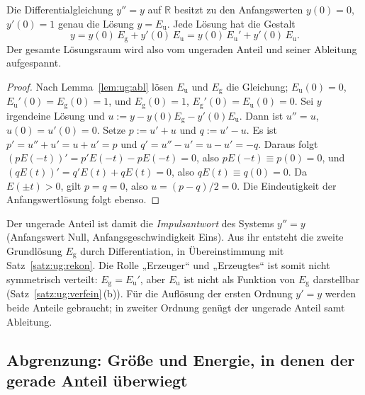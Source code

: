 \begin{satz}[Fundamentallösung]\label{satz:ug:fund}
Die Differentialgleichung $y''=y$ auf $\mathbb{R}$ besitzt zu den Anfangswerten $y(0)=0$, $y'(0)=1$ genau die Lösung $y=E_{\mathrm u}$. Jede Lösung hat die Gestalt
\[
y=y(0)\,E_{\mathrm g}+y'(0)\,E_{\mathrm u}=y(0)\,E_{\mathrm u}'+y'(0)\,E_{\mathrm u}.
\]
Der gesamte Lösungsraum wird also vom ungeraden Anteil und seiner Ableitung aufgespannt.
\end{satz}

\begin{proof}
Nach Lemma~\ref{lem:ug:abl} lösen $E_{\mathrm u}$ und $E_{\mathrm g}$ die Gleichung; $E_{\mathrm u}(0)=0$, $E_{\mathrm u}'(0)=E_{\mathrm g}(0)=1$, und $E_{\mathrm g}(0)=1$, $E_{\mathrm g}'(0)=E_{\mathrm u}(0)=0$. Sei $y$ irgendeine Lösung und $u:=y-y(0)E_{\mathrm g}-y'(0)E_{\mathrm u}$. Dann ist $u''=u$, $u(0)=u'(0)=0$. Setze $p:=u'+u$ und $q:=u'-u$. Es ist $p'=u''+u'=u+u'=p$ und $q'=u''-u'=u-u'=-q$. Daraus folgt $(pE(-t))'=p'E(-t)-pE(-t)=0$, also $pE(-t)\equiv p(0)=0$, und $(qE(t))'=q'E(t)+qE(t)=0$, also $qE(t)\equiv q(0)=0$. Da $E(\pm t)>0$, gilt $p=q=0$, also $u=(p-q)/2=0$. Die Eindeutigkeit der Anfangswertlösung folgt ebenso.
\end{proof}

\begin{bemerkung}
Der ungerade Anteil ist damit die \emph{Impulsantwort} des Systems $y''=y$ (Anfangswert Null, Anfangsgeschwindigkeit Eins). Aus ihr entsteht die zweite Grundlösung $E_{\mathrm g}$ durch Differentiation, in Übereinstimmung mit Satz~\ref{satz:ug:rekon}. Die Rolle „Erzeuger“ und „Erzeugtes“ ist somit nicht symmetrisch verteilt: $E_{\mathrm g}=E_{\mathrm u}'$, aber $E_{\mathrm u}$ ist nicht als Funktion von $E_{\mathrm g}$ darstellbar (Satz~\ref{satz:ug:verfein}\,(b)). Für die Auflösung der ersten Ordnung $y'=y$ werden beide Anteile gebraucht; in zweiter Ordnung genügt der ungerade Anteil samt Ableitung.
\end{bemerkung}

\subsection{Abgrenzung: Größe und Energie, in denen der gerade Anteil überwiegt}
\label{sec:ug:gewicht}

